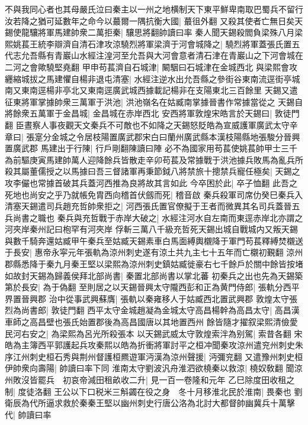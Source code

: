 不與我同心者也其母嚴氏泣曰秦主以一州之地横制天下東平鮮卑南取巴蜀兵不留行汝若降之猶可延數年之命今以蕞爾一隅抗衡大國|{
	蕞徂外翻}
又殺其使者亡無日矣天錫使龍驤將軍馬建帥衆二萬拒秦|{
	驤思將翻帥讀曰率}
秦人聞天錫殺閻負梁殊八月梁熙姚萇王統李辯濟自清石津攻涼驍烈將軍梁濟于河會城降之|{
	驍烈將軍蓋張氏置五代志允吾縣有青巖山水經注湟河至允吾與大河會意者清石津在青巖山之下河會城在二河之會歟驍堅堯翻}
甲申苟萇濟自石城津|{
	闞駰曰石城津在金城西北}
與梁熙會攻纒縮城拔之馬建懼自楊非退屯清塞|{
	水經注逆水出允吾縣之參街谷東南流逕街亭城南又東南逕楊非亭北又東南逕廣武城西據載記楊非在支陽東北三百餘里}
天錫又遣征東將軍掌據帥衆三萬軍于洪池|{
	洪池嶺名在姑臧南掌據晉書作常據當從之}
天錫自將餘衆五萬軍于金昌城|{
	金昌城在赤岸西北}
安西將軍敦煌宋皓言於天錫曰|{
	敦徒門翻}
臣晝察人事夜觀天文秦兵不可敵也不如降之天錫怒貶皓為宣威護軍廣武太守辛章曰|{
	張寔分金城之令居枝陽置廣武郡宋白曰蘭州廣武縣本漢枝陽縣地張駿分晉興置廣武郡}
馬建出于行陳|{
	行戶剛翻陳讀曰陣}
必不為國家用苟萇使姚萇帥甲士三千為前驅庚寅馬建帥萬人迎降餘兵皆散走辛卯苟萇及常據戰于洪池據兵敗馬為亂兵所殺其屬董儒授之以馬據曰吾三督諸軍再秉節鉞八將禁旅十摠禁兵寵任極矣|{
	天錫之攻李儼也常據首破其兵蓋河西推為良將故其言如此}
今卒困於此|{
	卒子恤翻}
此吾之死地也尚安之乎乃就帳免胄西向稽首伏劔而死|{
	稽音啟}
秦兵殺軍司席仂癸巳秦兵入清塞天錫遣司兵趙充哲帥衆拒之|{
	河西張氏置官僚擬于王者而微異其名司兵蓋晉五兵尚書之職也}
秦兵與充哲戰于赤岸大破之|{
	水經注河水自左南而東逕赤岸北亦謂之河夾岸秦州記曰枹罕有河夾岸}
俘斬三萬八千級充哲死天錫出城自戰城内又叛天錫與數千騎奔還姑臧甲午秦兵至姑臧天錫素車白馬面縛輿櫬降于軍門苟萇釋縛焚櫬送于長安|{
	惠帝永寜元年張軌為涼州刺史遂有涼土共九主七十五年而亡櫬初覲翻}
涼州郡縣悉降于秦九月秦王堅以梁熙為涼州刺史鎮姑臧徙豪右七千餘戶於關中餘皆按堵如故封天錫為歸義侯拜北部尚書|{
	秦置北部尚書以掌北蕃}
初秦兵之出也先為天錫築第於長安|{
	為于偽翻}
至則居之以天錫晉興太守隴西彭和正為黄門侍郎|{
	張軌分西平界置晉興郡}
治中從事武興蘇膺|{
	張軌以秦雍移人于姑臧西北置武興郡}
敦煌太守張烈為尚書郎|{
	敦徒門翻}
西平太守金城趙凝為金城太守高昌楊幹為高昌太守|{
	高昌漢車師之高昌壁也張氏始置郡後為高昌國唐以其地置西州}
餘皆隨才擢叙梁熙清儉愛民河右安之|{
	為梁熙為呂光所殺張本}
以天錫武威太守敦煌索泮為别駕|{
	索昔各翻}
宋皓為主簿西平郭護起兵攻秦熙以皓為折衝將軍討平之桓冲聞秦攻涼州遣兖州刺史朱序江州刺史桓石秀與荆州督護桓羆遊軍沔漢為涼州聲援|{
	沔彌兖翻}
又遣豫州刺史桓伊帥衆向壽陽|{
	帥讀曰率下同}
淮南太守劉波汎舟淮泗欲橈秦以救涼|{
	橈奴敎翻}
聞涼州敗沒皆罷兵　初哀帝減田租畝收二升|{
	見一百一卷隆和元年}
乙巳除度田收租之制|{
	度徒洛翻}
王公以下口税米三斛蠲在役之身　冬十月移淮北民於淮南|{
	畏秦也}
劉衛辰為代所逼求救於秦秦王堅以幽州刺史行唐公洛為北討大都督帥幽冀兵十萬擊代|{
	帥讀曰率}
